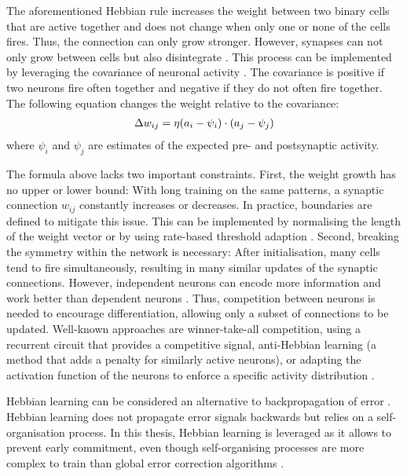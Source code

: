 The aforementioned Hebbian rule increases the weight between two binary cells that are active together and does not change when only one or none of the cells fires. Thus, the connection can only grow stronger.
However, synapses can not only grow between cells but also disintegrate .
This process can be implemented by leveraging the covariance of neuronal activity .
The covariance is positive if two neurons fire often together and negative if they do not often fire together.
The following equation changes the weight relative to the covariance:
%
\begin{align}\eqlbl{hebb_2}
	\Delta w_{ij} = \eta (a_i - \psi_i) \cdot (a_j - \psi_j)
\end{align}
%
where \(\psi_i\) and \(\psi_j\) are estimates of the expected pre- and postsynaptic activity.

The formula above lacks two important constraints.
First, the weight growth has no upper or lower bound: With long training on the same patterns, a synaptic connection $w_{ij}$ constantly increases or decreases. In practice, boundaries are defined to mitigate this issue. This can be implemented by normalising the length of the weight vector \cite{oja_simplified_1982} or by using rate-based threshold adaption .
Second, breaking the symmetry within the network is necessary: After initialisation, many cells tend to fire simultaneously, resulting in many similar updates of the synaptic connections. However, independent neurons can encode more information and work better than dependent neurons .
Thus, competition between neurons is needed to encourage differentiation, allowing only a subset of connections to be updated.
Well-known approaches are winner-take-all competition, using a recurrent circuit that provides a competitive signal, anti-Hebbian learning  (a method that adds a penalty for similarly active neurons), or adapting the activation function of the neurons to enforce a specific activity distribution .

Hebbian learning can be considered an alternative to backpropagation of error \cite{rosenblatt_principles_1962, linnainmaa_taylor_1976}.
Hebbian learning does not propagate error signals backwards but relies on a self-organisation process.
In this thesis, Hebbian learning is leveraged as it allows to prevent early commitment, even though self-organising processes are more complex to train than global error correction algorithms .


